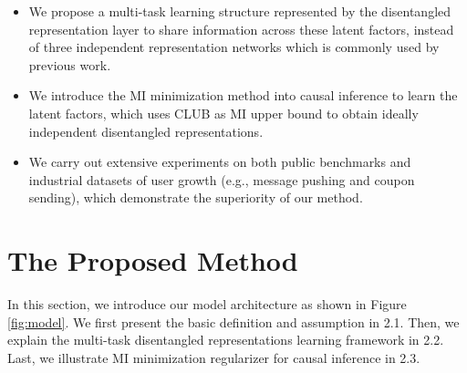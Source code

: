 \documentclass[sigconf]{acmart}
\begin{document}
\begin{itemize}
\item We propose a multi-task learning structure represented by the disentangled representation layer to share information across these latent factors, instead of three independent representation networks which is commonly used by previous work.
\item We introduce the MI minimization method into causal inference to learn the latent factors, which uses CLUB as MI upper bound to obtain ideally independent disentangled representations.
\item We carry out extensive experiments on both public benchmarks and industrial datasets of user growth (e.g., message pushing and coupon sending), which demonstrate the superiority of our method.
\end{itemize}

\section{The Proposed Method}
In this section, we introduce our model architecture as shown in Figure \ref{fig:model}. We first present the basic definition and assumption in 2.1. Then, we explain the multi-task disentangled representations learning framework in 2.2. Last, we illustrate MI minimization regularizer for causal inference in 2.3.
\end{document}

